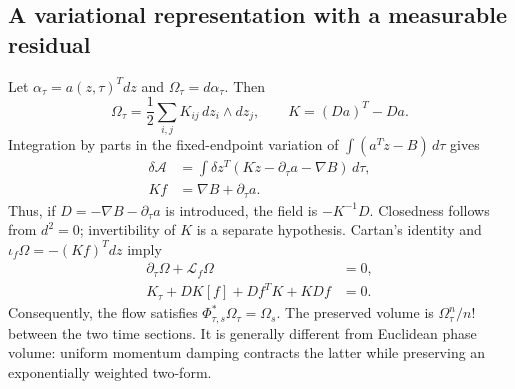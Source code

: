 \subsection{A variational representation with a measurable residual}
Let $\alpha_\tau=a(z,\tau)^T dz$ and $\Omega_\tau=d\alpha_\tau$. Then
\begin{equation}
 \Omega_\tau=\frac12\sum_{i,j}K_{ij}\,dz_i\wedge dz_j,
 \qquad K=(Da)^T-Da .
 \label{eq:th-form}
\end{equation}
Integration by parts in the fixed-endpoint variation of $\int(a^T\dot z-B)\,d\tau$ gives
\begin{equation}
 \begin{aligned}
 \delta\mathcal A&=\int\delta z^T(K\dot z-\partial_\tau a-\nabla B)\,d\tau,\\
 Kf&=\nabla B+\partial_\tau a .
\end{aligned}
 \label{eq:th-variation}
\end{equation}
Thus, if $D=-\nabla B-\partial_\tau a$ is introduced, the field is $-K^{-1}D$. Closedness follows from $d^2=0$; invertibility of $K$ is a separate hypothesis. Cartan's identity and $\iota_f\Omega=-(Kf)^Tdz$ imply
\begin{equation}
 \begin{aligned}
 \partial_\tau\Omega+\mathcal L_f\Omega&=0,\\
 K_\tau+DK[f]+Df^TK+KDf&=0.
\end{aligned}
 \label{eq:th-compatibility}
\end{equation}
Consequently, the flow satisfies $\Phi_{\tau,s}^*\Omega_\tau=\Omega_s$. The preserved volume is $\Omega_\tau^n/n!$ between the two time sections. It is generally different from Euclidean phase volume: uniform momentum damping contracts the latter while preserving an exponentially weighted two-form.

